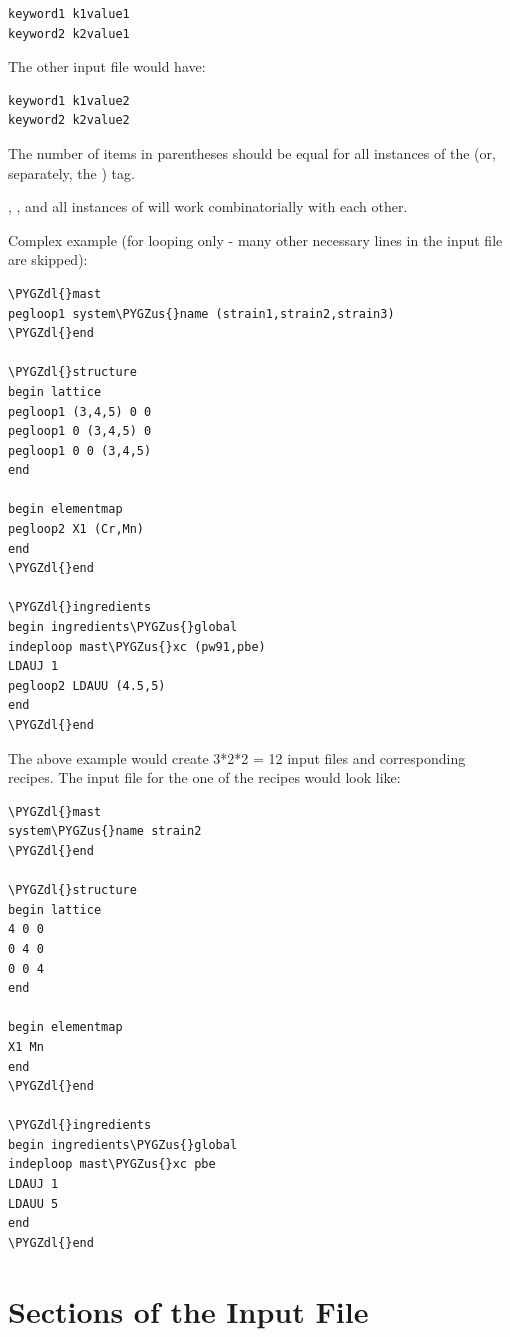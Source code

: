 \documentclass[letterpaper,10pt,english]{sphinxmanual}
\def\PYGZus{\char`\_}
\def\PYGZdl{\char`\$}
\begin{document}
\begin{Verbatim}[commandchars=\\\{\}]
keyword1 k1value1
keyword2 k2value1
\end{Verbatim}

The other input file would have:

\begin{Verbatim}[commandchars=\\\{\}]
keyword1 k1value2
keyword2 k2value2
\end{Verbatim}

The number of items in parentheses should be equal for all instances of the  (or, separately, the ) tag.

, , and all instances of  will work combinatorially with each other.

Complex example (for looping only - many other necessary lines in the input file are skipped):

\begin{Verbatim}[commandchars=\\\{\}]
\PYGZdl{}mast
pegloop1 system\PYGZus{}name (strain1,strain2,strain3)
\PYGZdl{}end

\PYGZdl{}structure
begin lattice
pegloop1 (3,4,5) 0 0
pegloop1 0 (3,4,5) 0
pegloop1 0 0 (3,4,5)
end

begin elementmap
pegloop2 X1 (Cr,Mn)
end
\PYGZdl{}end

\PYGZdl{}ingredients
begin ingredients\PYGZus{}global
indeploop mast\PYGZus{}xc (pw91,pbe)
LDAUJ 1
pegloop2 LDAUU (4.5,5)
end
\PYGZdl{}end
\end{Verbatim}

The above example would create 3*2*2 = 12 input files and corresponding recipes. The input file for the one of the recipes would look like:

\begin{Verbatim}[commandchars=\\\{\}]
\PYGZdl{}mast
system\PYGZus{}name strain2
\PYGZdl{}end

\PYGZdl{}structure
begin lattice
4 0 0
0 4 0
0 0 4
end

begin elementmap
X1 Mn
end
\PYGZdl{}end

\PYGZdl{}ingredients
begin ingredients\PYGZus{}global
indeploop mast\PYGZus{}xc pbe
LDAUJ 1
LDAUU 5
end
\PYGZdl{}end
\end{Verbatim}


\chapter{Sections of the Input File}
\label{3_1_inputsections:sections-of-the-input-file}\label{3_1_inputsections::doc}
\end{document}
